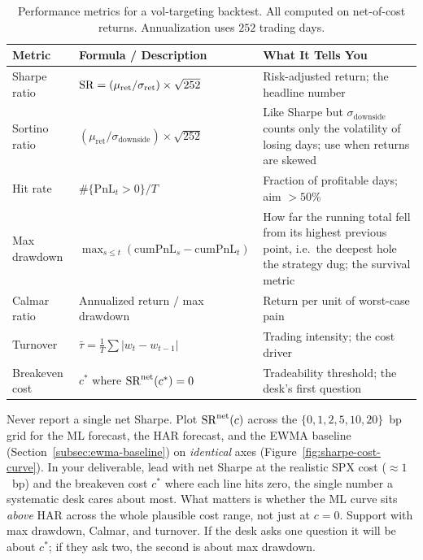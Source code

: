 \begin{table}[htbp]
\centering
\caption{Performance metrics for a vol-targeting backtest. All computed on net-of-cost returns. Annualization uses $252$ trading days.}
\label{tab:perf-metrics}
\begin{tabular}{p{2.9cm} p{6.3cm} p{4.0cm}}
\toprule
\textbf{Metric} & \textbf{Formula / Description} & \textbf{What It Tells You} \\
\midrule
Sharpe ratio & $\operatorname{SR} = (\mu_{\text{ret}} / \sigma_{\text{ret}}) \times \sqrt{252}$ & Risk-adjusted return; the headline number \\
\addlinespace
Sortino ratio & $(\mu_{\text{ret}} / \sigma_{\text{downside}}) \times \sqrt{252}$ & Like Sharpe but $\sigma_{\text{downside}}$ counts only the volatility of losing days; use when returns are skewed \\
\addlinespace
Hit rate & $\#\{\text{PnL}_t > 0\} / T$ & Fraction of profitable days; aim $> 50\%$ \\
\addlinespace
Max drawdown & $\max_{s \le t}(\text{cumPnL}_s - \text{cumPnL}_t)$ & How far the running total fell from its highest previous point, i.e.\ the deepest hole the strategy dug; the survival metric \\
\addlinespace
Calmar ratio & Annualized return $/$ max drawdown & Return per unit of worst-case pain \\
\addlinespace
Turnover & $\bar\tau = \tfrac{1}{T}\sum |w_t - w_{t-1}|$ & Trading intensity; the cost driver \\
\addlinespace
Breakeven cost & $c^\ast$ where $\operatorname{SR}^{\text{net}}(c^\ast) = 0$ & Tradeability threshold; the desk's first question \\
\bottomrule
\end{tabular}
\end{table}

\begin{keyidea}
Never report a single net Sharpe. Plot $\operatorname{SR}^{\text{net}}(c)$ across the $\{0, 1, 2, 5, 10, 20\}$~bp grid for the ML forecast, the HAR forecast, and the EWMA baseline (Section~\ref{subsec:ewma-baseline}) on \emph{identical} axes (Figure~\ref{fig:sharpe-cost-curve}). In your deliverable, lead with net Sharpe at the realistic SPX cost ($\approx 1$~bp) and the breakeven cost $c^\ast$ where each line hits zero, the single number a systematic desk cares about most. What matters is whether the ML curve sits \emph{above} HAR across the whole plausible cost range, not just at $c = 0$. Support with max drawdown, Calmar, and turnover. If the desk asks one question it will be about $c^\ast$; if they ask two, the second is about max drawdown.
\end{keyidea}

